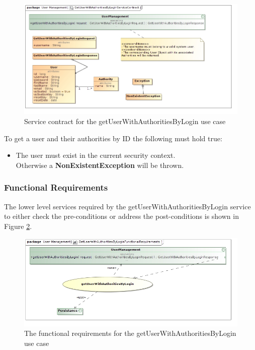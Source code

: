 \begin{figure}[H]
	\begin{center}
		\includegraphics[scale=0.55]{../Diagrams and Charts/Users/GetUserWithAuthoritiesByLoginServiceContract.jpg}
		\caption{Service contract for the getUserWithAuthoritiesByLogin use case}
		\label{fig:GetUserWithAuthoritiesByLoginServicesContract}
	\end{center}
\end{figure}

To get a user and their authorities by ID the following must hold true:
\begin{itemize}
	\item The user must exist in the current security context.\\
	Otherwise a \textbf{NonExistentException} will be thrown.
\end{itemize}

\subsubsection{Functional Requirements}
The lower level services required by the getUserWithAuthoritiesByLogin service
to either check the pre-conditions or address the post-conditions is shown
in Figure \ref{getUserWithAuthoritiesByLoginFR}.

\begin{figure}[H]
	\begin{center}
		\includegraphics[scale=0.5]{../Diagrams and Charts/Users/GetUserWithAuthoritiesByLoginFunctionalRequirements.jpg}
		\caption{The functional requirements for the getUserWithAuthoritiesByLogin use case}
		\label{getUserWithAuthoritiesByLoginFR}
	\end{center}	
\end{figure}

